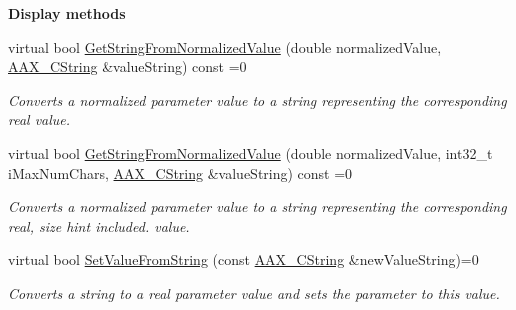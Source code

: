 \begin{Indent}{\bf Display methods}
\begin{DoxyCompactItemize}
virtual bool \hyperlink{a00108_a09ace7e2456911607d113593ab4d55d6}{Get\+String\+From\+Normalized\+Value} (double normalized\+Value, \hyperlink{a00042}{A\+A\+X\+\_\+\+C\+String} \&value\+String) const =0
\begin{DoxyCompactList}\small\item\em Converts a normalized parameter value to a string representing the corresponding real value. \end{DoxyCompactList}\item 
virtual bool \hyperlink{a00108_a9339e5ef2545f22fe95f6c6ab40ee3aa}{Get\+String\+From\+Normalized\+Value} (double normalized\+Value, int32\+\_\+t i\+Max\+Num\+Chars, \hyperlink{a00042}{A\+A\+X\+\_\+\+C\+String} \&value\+String) const =0
\begin{DoxyCompactList}\small\item\em Converts a normalized parameter value to a string representing the corresponding real, size hint included. value. \end{DoxyCompactList}\item 
virtual bool \hyperlink{a00108_ae4caa85ca368e684f813147443bdde55}{Set\+Value\+From\+String} (const \hyperlink{a00042}{A\+A\+X\+\_\+\+C\+String} \&new\+Value\+String)=0
\begin{DoxyCompactList}\small\item\em Converts a string to a real parameter value and sets the parameter to this value. \end{DoxyCompactList}\end{DoxyCompactItemize}
\end{Indent}
